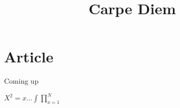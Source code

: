\documentclass[12pt]{llncs}%
\title{Carpe Diem}
\begin{document}
\maketitle
\section{Article}
Coming up

\(X^2=x\dots\int \prod \limits _{x=1}^{N}\)





	
	
	  
	  
\end{document}
